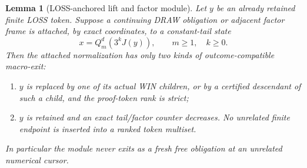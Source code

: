 \documentclass[11pt]{article}
\newtheorem{lemma}[theorem]{Lemma}
\begin{document}
\begin{lemma}[LOSS-anchored lift and factor module]
\label{lem:loss-anchored-lift}
Let $y$ be an already retained finite LOSS token.  Suppose a continuing DRAW
obligation or adjacent factor frame is attached, by exact coordinates, to a
constant-tail state
\[
 x=Q_m^d(3^kJ(y)),\qquad m\ge1,\quad k\ge0.
\]
Then the attached normalization has only two kinds of outcome-compatible
macro-exit:
\begin{enumerate}[label=(\alph*)]
\item $y$ is replaced by one of its actual WIN children, or by a certified
      descendant of such a child, and the proof-token rank is strict;
\item $y$ is retained and an exact tail/factor counter decreases.  No
      unrelated finite endpoint is inserted into a ranked token multiset.
\end{enumerate}
In particular the module never exits as a fresh free obligation at an
unrelated numerical cursor.
\end{lemma}
\end{document}
